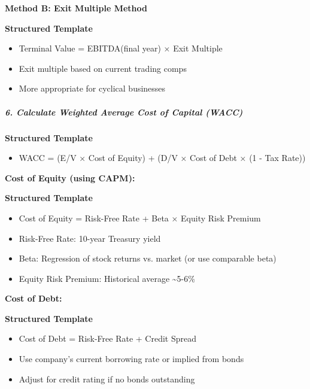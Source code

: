 \documentclass[11pt]{article}
\begin{document}
\textbf{Method B: Exit Multiple Method}

\textbf{Structured Template}
\begin{itemize}[leftmargin=*,itemsep=2pt,topsep=2pt]
\item {} Terminal Value = EBITDA(final year) × Exit Multiple
\end{itemize}
\begin{itemize}[leftmargin=*,itemsep=2pt,topsep=2pt]
\item {} Exit multiple based on current trading comps
\item {} More appropriate for cyclical businesses
\end{itemize}

\subparagraph{6. Calculate Weighted Average Cost of Capital (WACC)}\mbox{}\par

\textbf{Structured Template}
\begin{itemize}[leftmargin=*,itemsep=2pt,topsep=2pt]
\item {} WACC = (E/V × Cost of Equity) + (D/V × Cost of Debt × (1 - Tax Rate))
\end{itemize}

\textbf{Cost of Equity (using CAPM):}

\textbf{Structured Template}
\begin{itemize}[leftmargin=*,itemsep=2pt,topsep=2pt]
\item {} Cost of Equity = Risk-Free Rate + Beta × Equity Risk Premium
\end{itemize}
\begin{itemize}[leftmargin=*,itemsep=2pt,topsep=2pt]
\item {} Risk-Free Rate: 10-year Treasury yield
\item {} Beta: Regression of stock returns vs. market (or use comparable beta)
\item {} Equity Risk Premium: Historical average \textasciitilde{}5-6\%
\end{itemize}

\textbf{Cost of Debt:}

\textbf{Structured Template}
\begin{itemize}[leftmargin=*,itemsep=2pt,topsep=2pt]
\item {} Cost of Debt = Risk-Free Rate + Credit Spread
\end{itemize}
\begin{itemize}[leftmargin=*,itemsep=2pt,topsep=2pt]
\item {} Use company's current borrowing rate or implied from bonds
\item {} Adjust for credit rating if no bonds outstanding
\end{itemize}
\end{document}
